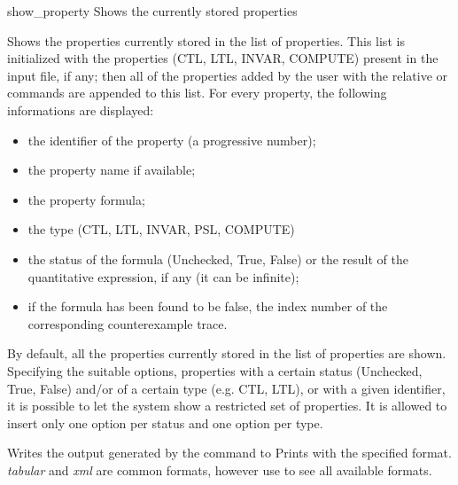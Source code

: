 \begin{nusmvCommand} {show\_property} {Shows the currently stored properties}


Shows the properties currently stored in the list of properties. This
list is initialized with the properties (CTL, LTL, INVAR, COMPUTE)
present in the input file, if any; then all of the properties added by
the user with the relative  or 
commands are appended to this list.  For every property, the following
informations are displayed:
\begin{itemize}
\item the identifier of the property (a progressive number);
\item the property name if available; 
\item the property formula; 
\item the type (CTL, LTL, INVAR, PSL, COMPUTE)
\item the status of the formula (Unchecked, True, False) or the result
  of the quantitative expression, if any (it can be infinite);
\item if the formula has been found to be false, the index number of
  the corresponding counterexample trace.
\end{itemize}
By default, all the properties currently stored in the list of
properties are shown. Specifying the suitable options, properties with
a certain status (Unchecked, True, False) and/or of a certain type
(e.g. CTL, LTL), or with a given identifier, it is possible to let the
system show a restricted set of properties. It is allowed to insert
only one option per status and one option per type.

\begin{cmdOpt}
 {Writes the output generated
  by the command to }
 {Prints with the specified
  format.  {\it tabular} and {\it xml} are common formats, however use
   to see all available formats.}
\end{cmdOpt}

\end{nusmvCommand}
